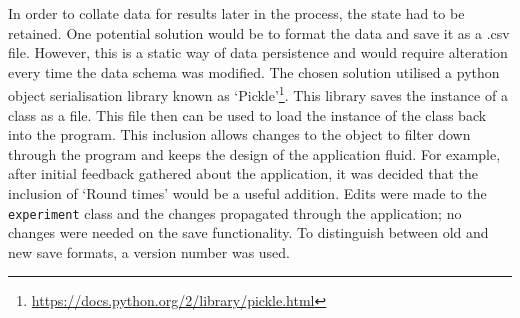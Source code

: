 In order to collate data for results later in the process, the state had to be retained. One potential solution would be to format the data and save it as a .csv file. However, this is a static way of data persistence and would require alteration every time the data schema was modified. The chosen solution utilised a python object serialisation library known as `Pickle'\footnote{\url{https://docs.python.org/2/library/pickle.html}}. This library saves the instance of a class as a file. This file then can be used to load the instance of the class back into the program. This inclusion allows changes to the object to filter down through the program and keeps the design of the application fluid. For example, after initial feedback gathered about the application, it was decided that the inclusion of `Round times' would be a useful addition. Edits were made to the \verb|experiment| class and the changes propagated through the application; no changes were needed on the save functionality. To distinguish between old and new save formats, a version number was used.